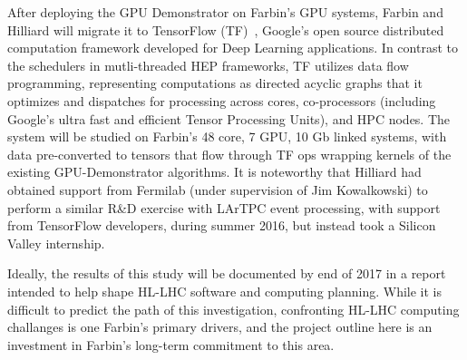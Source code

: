 After deploying the GPU Demonstrator on Farbin's GPU systems, Farbin
and Hilliard will migrate it to TensorFlow (TF)~\cite{}, Google's open
source distributed computation framework developed for Deep Learning
applications.  In contrast to the schedulers in mutli-threaded HEP
frameworks, TF utilizes data flow programming, representing
computations as directed acyclic graphs that it optimizes and
dispatches for processing across cores, co-processors (including
Google's ultra fast and efficient Tensor Processing Units), and HPC
nodes.  The system will be studied on Farbin's 48 core, 7 GPU, 10 Gb
linked systems, with data pre-converted to tensors that flow through
TF ops wrapping kernels of the existing GPU-Demonstrator
algorithms. It is noteworthy that Hilliard had obtained support from
Fermilab (under supervision of Jim Kowalkowski) to perform a similar
R\&D exercise with LArTPC event processing, with support from
TensorFlow developers, during summer 2016, but instead took a Silicon
Valley internship.

Ideally, the results of this study will be documented by end of 2017
in a report intended to help shape HL-LHC software and computing
planning. While it is difficult to predict the path of this
investigation, confronting HL-LHC computing challanges is one Farbin's
primary drivers, and the project outline here is an investment in
Farbin's long-term commitment to this area.







